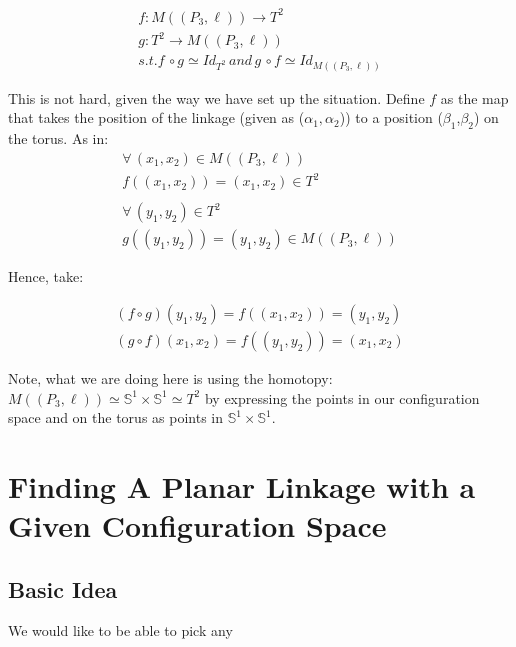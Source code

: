 \documentclass{article}
\begin{document}
\begin{gather*}
f: M((P_3,\ell)) \rightarrow T^2 \\
g: T^2 \rightarrow M((P_3,\ell)) \\
s.t. f \, \circ g \simeq Id_{T^2} \, and \, g \, \circ f \simeq Id_{M((P_3,\ell))}
\end{gather*}

\noindent This is not hard, given the way we have set up the situation. Define $f$ as the map that takes the position of the linkage (given as ($\alpha_1, \alpha_2$)) to a position ($\beta_1$,$\beta_2$) on the torus. As in: 
\begin{gather*}
\forall \, (x_1, x_2) \in M((P_3,\ell)) \\ f((x_1,x_2)) = (x_1,x_2) \in T^2 \\\\
\forall \, (y_1, y_2) \in T^2 \\ g((y_1,y_2)) = (y_1,y_2) \in M((P_3, \ell))
\end{gather*}

\noindent Hence, take:

\begin{gather*}
(f \circ g)(y_1, y_2) = f((x_1,x_2)) = (y_1, y_2) \\
(g \circ f)(x_1, x_2) = f((y_1,y_2)) = (x_1, x_2)
\end{gather*}

\noindent Note, what we are doing here is using the homotopy: $M((P_3,\ell)) \simeq \mathbb S^1 \times \mathbb S^1 \simeq T^2$ by expressing the points in our configuration space and on the torus as points in $\mathbb S^1 \times \mathbb S^1$.

\section{Finding A Planar Linkage with a Given Configuration Space}
\subsection{Basic Idea}

We would like to be able to pick any 




\end{document}
